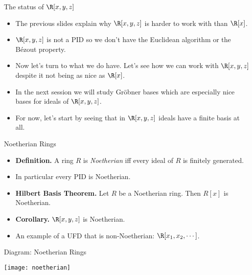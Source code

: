 \documentclass{beamer}
\begin{document}

\begin{frame}{The status of $\R[x,y,z]$}

\begin{itemize}
  \item The previous slides explain why $\R[x,y,z]$ is harder to work with than $\R[x]$.
  \item $\R[x,y,z]$ is not a PID so we don't have the Euclidean algorithm or the B\'{e}zout property.
  \item Now let's turn to what we do have. Let's see how we can work with $\R[x,y,z]$ despite it not being as nice as $\R[x]$.
  \item In the next session we will study Gr\"{o}bner bases which are especially nice bases for ideals of $\R[x,y,z]$.
  \item For now, let's start by seeing that in $\R[x,y,z]$ ideals have a finite basis at all.
\end{itemize}

\end{frame}



\begin{frame}{Noetherian Rings}

\begin{itemize}
  \item \textbf{Definition.} A ring $R$ is \emph{Noetherian} iff every ideal of $R$ is finitely generated.
  \item In particular every PID is Noetherian.
  \item \textbf{Hilbert Basis Theorem.} Let $R$ be a Noetherian ring. Then $R[x]$ is Noetherian.
  \item \textbf{Corollary.} $\R[x,y,z]$ is Noetherian.
  \item An example of a UFD that is non-Noetherian: $\R[x_1, x_2, \cdots]$.
\end{itemize}

\end{frame}



\begin{frame}{Diagram: Noetherian Rings}

\begin{center}
\texttt{[image: noetherian]}
\end{center}

\end{frame}
\end{document}
